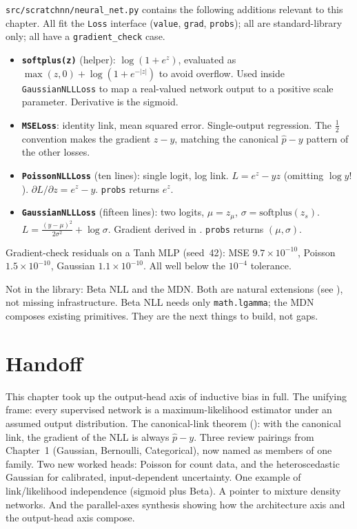 \texttt{src/scratchnn/neural\_net.py} contains the following additions
relevant to this chapter. All fit the \texttt{Loss} interface
(\texttt{value}, \texttt{grad}, \texttt{probs}); all are standard-library
only; all have a \texttt{gradient\_check} case.

\begin{itemize}
\item \textbf{\texttt{softplus(z)}} (helper):
  $\log(1 + e^z)$, evaluated as $\max(z, 0) + \log(1 + e^{-|z|})$
  to avoid overflow. Used inside \texttt{GaussianNLLLoss} to map a
  real-valued network output to a positive scale parameter. Derivative
  is the sigmoid.
\item \textbf{\texttt{MSELoss}}: identity link, mean squared error.
  Single-output regression. The $\tfrac{1}{2}$ convention makes the
  gradient $z - y$, matching the canonical $\hat{p} - y$ pattern of
  the other losses.
\item \textbf{\texttt{PoissonNLLLoss}} (ten lines): single logit, log
  link. $L = e^z - yz$ (omitting $\log y!$).
  $\partial L / \partial z = e^z - y$. \texttt{probs} returns $e^z$.
\item \textbf{\texttt{GaussianNLLLoss}} (fifteen lines): two logits,
  $\mu = z_\mu$, $\sigma = \mathrm{softplus}(z_s)$.
  $L = \tfrac{(y-\mu)^2}{2\sigma^2} + \log\sigma$.
  Gradient derived in . \texttt{probs}
  returns $(\mu, \sigma)$.
\end{itemize}

Gradient-check residuals on a Tanh MLP (seed~42): MSE
$9.7 \times 10^{-10}$, Poisson $1.5 \times 10^{-10}$, Gaussian
$1.1 \times 10^{-10}$. All well below the $10^{-4}$ tolerance.

Not in the library: Beta NLL and the MDN. Both are natural extensions
(see ), not missing infrastructure.
Beta NLL needs only \texttt{math.lgamma}; the MDN composes existing
primitives. They are the next things to build, not gaps.

\section{Handoff}\label{sec:handoff}

This chapter took up the output-head axis of inductive bias in full. The
unifying frame: every supervised network is a maximum-likelihood
estimator under an assumed output distribution. The canonical-link
theorem (): with the canonical link, the
gradient of the NLL is always $\hat{p} - y$. Three review pairings
from Chapter~1 (Gaussian, Bernoulli, Categorical), now named as members
of one family. Two new worked heads: Poisson for count data, and the
heteroscedastic Gaussian for calibrated, input-dependent uncertainty.
One example of link/likelihood independence (sigmoid plus Beta). A
pointer to mixture density networks. And the parallel-axes synthesis
showing how the architecture axis and the output-head axis compose.

